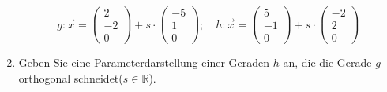 \documentclass[12pt,a4paper,twoside,fleqn]{article}
\begin{document}
\begin{enumerate}
$$g: \vec{x}= 
    \begin{pmatrix}
      2\\-2\\0
    \end{pmatrix} 
    + s\cdot
    \begin{pmatrix}
      -5\\1\\0
    \end{pmatrix};\quad
    h: \vec{x}= 
    \begin{pmatrix}
      5\\-1\\0
    \end{pmatrix} 
    + s\cdot
    \begin{pmatrix}
      -2\\2\\0
    \end{pmatrix}$$

\item Geben Sie eine Parameterdarstellung einer Geraden $h$ an, die
  die Gerade $g$ orthogonal schneidet($s\in\mathbb{R}$).


\end{enumerate}
\end{document}
